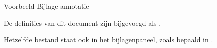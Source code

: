 \documentclass[12pt,dutch]{article}
\begin{document}
    \begin{center}
        \Huge Voorbeeld Bijlage-annotatie
    \end{center}

    \label{art:bijlage}
    \begin{paras}
        \item \label{lid:bijlage} De definities van dit document zijn bijgevoegd als
            .
        \item \label{lid:paneel} Hetzelfde bestand staat ook in het bijlagenpaneel,
            zoals bepaald in .
    \end{paras}
\end{document}
